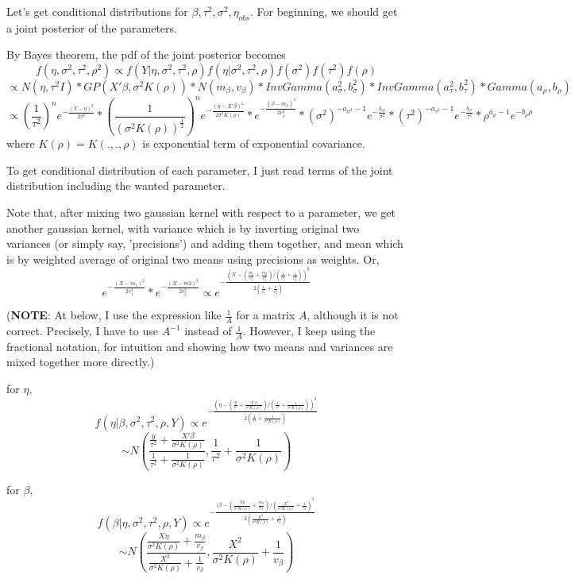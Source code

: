 \documentclass{article}
\begin{document}
Let's get conditional distributions for $\beta, \tau^2, \sigma^2, \eta_{obs}$.
For beginning, we should get a joint posterior of the parameters.

By Bayes theorem, the pdf of the joint posterior becomes
\[f(\eta,\sigma^2,\tau^2,\rho^2)
    \propto f(Y|\eta,\sigma^2,\tau^2,\rho)f(\eta|\sigma^2,\tau^2,\rho)f(\sigma^2)f(\tau^2)f(\rho)\]
\[\propto N(\eta,\tau^2I) * GP(X'\beta, \sigma^2 K(\rho))
    * N(m_\beta,v_\beta) * InvGamma(a_\sigma^2, b_\sigma^2) * InvGamma(a_\tau^2, b_\tau^2)
    * Gamma(a_\rho, b_\rho) \]
\[\propto (\frac{1}{\tau^2})^n e^{-\frac{(Y-\eta)^2}{2\tau^2}}
    * (\frac{1}{(\sigma^2 K(\rho))^{\frac{1}{2}}})^n e^{-\frac{(\eta-X'\beta)^2}{2\sigma^2 K(\rho)}}
    * e^{-\frac{(\beta-m_\beta)^2}{2v_\beta^2}}
    * (\sigma^2)^{-a_{\sigma^2}-1} e^{-\frac{b_{\sigma^2}}{\sigma^2}}
    * (\tau^2)^{-a_{\tau^2}-1} e^{-\frac{b_{\tau^2}}{\tau^2}}
    * \rho^{a_{\rho}-1} e^{-b_{\rho}\rho}
    \]
where $K(\rho)=K(.,.,\rho)$ is exponential term of exponential covariance.

To get conditional distribution of each parameter, I just read terms of the joint distribution
including the wanted parameter. 

Note that, after mixing two gaussian kernel with respect to a parameter,
we get another gaussian kernel, with variance which is by inverting original two variances (or simply say, 'precisions') and adding them together,
and mean which is by weighted average of original two means using precisions as weights. Or,
\[e^{-\frac{(X-m_1)^2}{2v_1^2}} * e^{-\frac{(X-m2)^2}{2v_2^2}}
    \propto e^{-\frac{(X-(\frac{m_1}{v_1^2} + \frac{m_2}{v_2^2})/(\frac{1}{v_1^2} + \frac{1}{v_2^2}))^2}{2(\frac{1}{v_1^2}+\frac{1}{v_2^2})}}\]

\clearpage
(\textbf{NOTE}: At below, I use the expression like $\frac{1}{A}$ for a matrix $A$, although it is not correct. 
Precisely, I have to use $A^{-1}$ instead of $\frac{1}{A}$.
However, I keep using the fractional notation, for intuition and showing how two means and variances are mixed together more directly.)

for $\eta$,
\[f(\eta|\beta,\sigma^2,\tau^2,\rho,Y) \propto e^{-\frac{(\eta - (\frac{y}{\tau^2} + \frac{X'\beta}{\sigma^2 K(\rho)}) / (\frac{1}{\tau^2}+\frac{1}{\sigma^2 K(\rho)}))^2}{2(\frac{1}{\tau^2}+\frac{1}{\sigma^2 K(\rho)})}}
\]
\[\sim N(\frac{\frac{y}{\tau^2} + \frac{X'\beta}{\sigma^2 K(\rho)}}{\frac{1}{\tau^2}+\frac{1}{\sigma^2 K(\rho)}}, \frac{1}{\tau^2}+\frac{1}{\sigma^2 K(\rho)})\]

for $\beta$,
\[f(\beta|\eta,\sigma^2,\tau^2,\rho,Y) \propto e^{-\frac{(\beta - (\frac{X\eta}{\sigma^2 K(\rho)} + \frac{m_\beta}{v_\beta}) / (\frac{X^2}{\sigma^2 K(\rho)}+\frac{1}{v_\beta})^2}{2(\frac{X^2}{\sigma^2 K(\rho)}+\frac{1}{v_\beta})}}
\]
\[\sim N(\frac{\frac{X\eta}{\sigma^2 K(\rho)} + \frac{m_\beta}{v_\beta}}{\frac{X^2}{\sigma^2 K(\rho)}+\frac{1}{v_\beta}}, \frac{X^2}{\sigma^2 K(\rho)}+\frac{1}{v_\beta})\]
\end{document}
